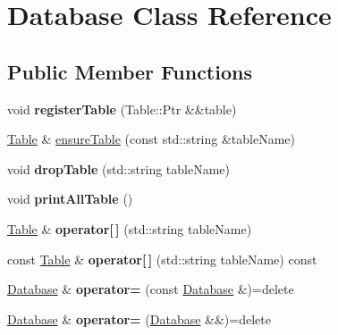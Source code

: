 \hypertarget{class_database}{}\section{Database Class Reference}
\label{class_database}
\subsection*{Public Member Functions}
\begin{DoxyCompactItemize}
\item 
\mbox{\label{class_database_adc114c831a4569d60c6334a943f48516}} 
void {\bfseries register\+Table} (Table\+::\+Ptr \&\&table)
\item 
\hyperlink{class_table}{Table} \& \hyperlink{class_database_a1405a11517ac20b0036514120782cee5}{ensure\+Table} (const std\+::string \&table\+Name)
\item 
\mbox{\label{class_database_a95a3310cac23f486f309bcc69fa034a4}} 
void {\bfseries drop\+Table} (std\+::string table\+Name)
\item 
\mbox{\label{class_database_a6f6dad3936a8cf6274924156fa28c4b7}} 
void {\bfseries print\+All\+Table} ()
\item 
\mbox{\label{class_database_a07b70401d5381678c781f0eb09cfeaa0}} 
\hyperlink{class_table}{Table} \& {\bfseries operator\mbox{[}$\,$\mbox{]}} (std\+::string table\+Name)
\item 
\mbox{\label{class_database_a7c76b022a64b9ef07e3255b937d28bea}} 
const \hyperlink{class_table}{Table} \& {\bfseries operator\mbox{[}$\,$\mbox{]}} (std\+::string table\+Name) const
\item 
\mbox{\label{class_database_a91a7742eb10d89e79b534ce3d093e40f}} 
\hyperlink{class_database}{Database} \& {\bfseries operator=} (const \hyperlink{class_database}{Database} \&)=delete
\item 
\mbox{\label{class_database_a1a54186b16f03c8e6e26b8361fe69ddd}} 
\hyperlink{class_database}{Database} \& {\bfseries operator=} (\hyperlink{class_database}{Database} \&\&)=delete
\item 

\end{DoxyCompactItemize}
